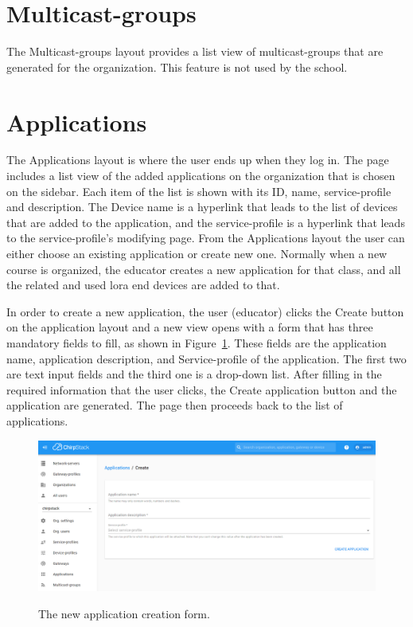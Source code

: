 \section{Multicast-groups}
The Multicast-groups layout provides a list view of multicast-groups that are generated for the organization.
This feature is not used by the school.

\section{Applications}
The Applications layout is where the user ends up when they log in.
The page includes a list view of the added applications on the organization that is chosen on the sidebar.
Each item of the list is shown with its ID, name, service-profile and description.
The Device name is a hyperlink that leads to the list of devices that are added to the application, and the service-profile is a hyperlink that leads to the service-profile's modifying page.
From the Applications layout the user can either choose an existing application or create new one.
Normally when a new course is organized, the educator creates a new application for that class, and all the related and used \gls{lora} end devices are added to that.

In order to create a new application, the user (educator) clicks the Create button on the application layout and a new view opens with a form that has three mandatory fields to fill, as shown in Figure~\ref{fig:ChirpStack_new_application}.
These fields are the application name, application description, and Service-profile of the application.
The first two are text input fields and the third one is a drop-down list.
After filling in the required information that the user clicks, the Create application button and the application are generated.
The page then proceeds back to the list of applications.

\begin{figure}[ht]
  \centering
  {\includegraphics[width=\textwidth]{illustration/ChirpStack_new_application.png}}
  \caption{The new application creation form.}
  \label{fig:ChirpStack_new_application}
\end{figure}

